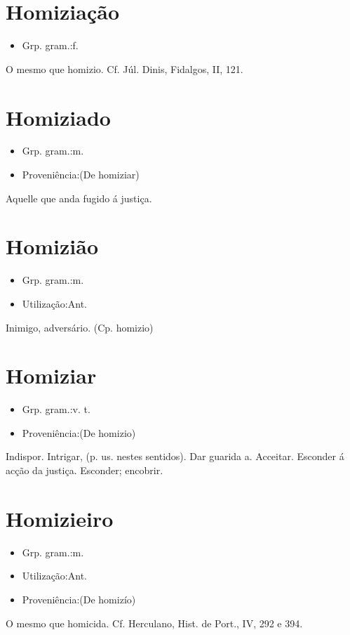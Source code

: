 \documentclass{article}
\begin{document}
\section{Homiziação}
\begin{itemize}
\item {Grp. gram.:f.}
\end{itemize}
O mesmo que \textunderscore homizio\textunderscore . Cf. Júl. Dinis, \textunderscore Fidalgos\textunderscore , II, 121.
\section{Homiziado}
\begin{itemize}
\item {Grp. gram.:m.}
\end{itemize}
\begin{itemize}
\item {Proveniência:(De \textunderscore homiziar\textunderscore )}
\end{itemize}
Aquelle que anda fugido á justiça.
\section{Homizião}
\begin{itemize}
\item {Grp. gram.:m.}
\end{itemize}
\begin{itemize}
\item {Utilização:Ant.}
\end{itemize}
Inimigo, adversário.
(Cp. \textunderscore homizio\textunderscore )
\section{Homiziar}
\begin{itemize}
\item {Grp. gram.:v. t.}
\end{itemize}
\begin{itemize}
\item {Proveniência:(De \textunderscore homizio\textunderscore )}
\end{itemize}
Indispor.
Intrigar, (p. us. nestes sentidos).
Dar guarida a.
Acceitar.
Esconder á acção da justiça.
Esconder; encobrir.
\section{Homizieiro}
\begin{itemize}
\item {Grp. gram.:m.}
\end{itemize}
\begin{itemize}
\item {Utilização:Ant.}
\end{itemize}
\begin{itemize}
\item {Proveniência:(De \textunderscore homizío\textunderscore )}
\end{itemize}
O mesmo que \textunderscore homicida\textunderscore . Cf. Herculano, \textunderscore Hist. de Port.\textunderscore , IV, 292 e 394.
\end{document}
